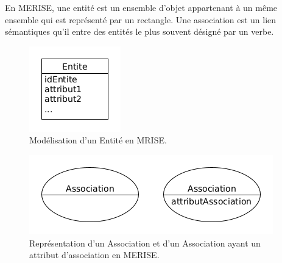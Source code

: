 \documentclass[12pt,a4paper]{article}
\begin{document}
	En MERISE, une entité est un ensemble d'objet appartenant à un même ensemble qui est représenté par un rectangle. Une association est un lien sémantiques qu'il entre des entités le plus souvent désigné par un verbe.
	
	\begin{figure}[H]
		\centering
		\includegraphics[width=.25\textwidth]{./images/entite}
		\caption{Modélisation d'un Entité en MRISE.}
		\label{fig:figure5}
	\end{figure}

	\begin{figure}[H]
	\centering
	\includegraphics[width=.75\textwidth]{./images/association}
	\caption{Représentation d'un Association et d'un Association ayant un attribut d'association en MERISE.}
	\label{fig:figure5.5}
	\end{figure}
\end{document}
